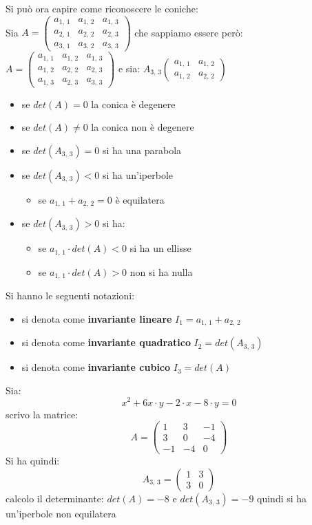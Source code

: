 \documentclass[a4paper,12pt, oneside]{book}
\begin{document}
Si può ora capire come riconoscere le coniche:\\
Sia $A=
	\left(\begin{matrix}
			a_{1,\,1} & a_{1,\,2} & a_{1,\,3} \\
			a_{2,\,1} & a_{2,\,2} & a_{2,\,3} \\
			a_{3,\,1} & a_{3,\,2} & a_{3,\,3}
		\end{matrix}\right)$ che sappiamo essere però:
$A=
	\left(\begin{matrix}
			a_{1,\,1} & a_{1,\,2} & a_{1,\,3} \\
			a_{1,\,2} & a_{2,\,2} & a_{2,\,3} \\
			a_{1,\,3} & a_{2,\,3} & a_{3,\,3}
		\end{matrix}\right)$
e sia:
$
	A_{3,\,3}\left(\begin{matrix}
			a_{1,\,1} & a_{1,\,2} \\
			a_{1,\,2} & a_{2,\,2}
		\end{matrix}\right)
$
\begin{itemize}
	\item se $det(A)=0 $ la conica è degenere
	\item se $det(A)\neq 0 $ la conica non è degenere
	\item se $det(A_{3,\,3})= 0 $ si ha una parabola
	\item se $det(A_{3,\,3})< 0 $ si ha un'iperbole
	      \begin{itemize}
		      \item se $a_{1,\,1}+a_{2,\,2}=0$ è equilatera
	      \end{itemize}
	\item se $det(A_{3,\,3})>0$ si ha:
	      \begin{itemize}
		      \item se $a_{1,\,1}\cdot det(A)<0$ si ha un ellisse
		      \item se $a_{1,\,1}\cdot det(A)>0$ non si ha nulla
	      \end{itemize}
\end{itemize}
Si hanno le seguenti notazioni:
\begin{itemize}
	\item si denota come \textbf{invariante lineare} $I_1=a_{1,\,1}+a_{2,\,2}$
	\item si denota come \textbf{invariante quadratico}  $I_2=det(A_{3,\,3})$
	\item si denota come \textbf{invariante cubico} $I_3=det(A)$
\end{itemize}
\newpage
\begin{esempio}
	Sia:
	$$x^2+6x\cdot y-2\cdot x-8\cdot y=0$$
	scrivo la matrice:
	$$
		A=\left(\begin{matrix}
				1  & 3  & -1 \\
				3  & 0  & -4 \\
				-1 & -4 & 0
			\end{matrix}\right)
	$$
	Si ha quindi:
	$$
		A_{3,\,3}=\left(\begin{matrix}
				1 & 3 \\
				3 & 0
			\end{matrix}\right)
	$$
	calcolo il determinante: $det(A)=-8$ e $det(A_{3,\,3})=-9$ quindi si ha un'iperbole non equilatera
\end{esempio}
\end{document}
